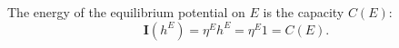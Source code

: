 The energy of the equilibrium potential on $E$ is the capacity $C(E)$:
$$\mathbf{I}(h^E) = \eta^E h^E = \eta^E 1 = C(E).$$
